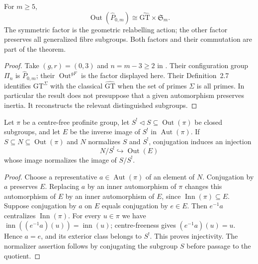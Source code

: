 For $m\geq5$,
\[
 \operatorname{Out}(\widehat P_{0,m})
       \cong\widehat{\mathrm{GT}}\times\mathfrak S_m.
\]
The symmetric factor is the geometric relabelling action; the other factor
preserves all generalized fibre subgroups.  Both factors and their
commutation are part of the theorem.
\begin{proof}
Take $(g,r)=(0,3)$ and $n=m-3\geq2$ in
\citet[Corollaries~2.6(i),(iii) and~2.8(i),(ii)]{HoshiMinamideMochizuki2022}.
Their configuration group $\Pi_n$ is $\widehat P_{0,m}$; their
$\operatorname{Out}^{gF}$ is the factor displayed here.  Their
Definition~2.7 identifies $\mathrm{GT}^{\Sigma}$ with the classical
$\widehat{\mathrm{GT}}$ when the set of primes $\Sigma$ is all primes.
In particular the result does not presuppose that a given automorphism
preserves inertia.  It reconstructs the relevant distinguished subgroups.
\end{proof}

Let $\pi$ be a centre-free profinite group, let
$S^!\triangleleft S\subseteq\operatorname{Out}(\pi)$ be closed subgroups,
and let $E$ be the inverse image of $S^!$ in $\operatorname{Aut}(\pi)$.
If $S\subseteq N\subseteq\operatorname{Out}(\pi)$ and $N$ normalizes
$S$ and $S^!$, conjugation induces an injection
\[
 N/S^!\hookrightarrow\operatorname{Out}(E)
\]
whose image normalizes the image of $S/S^!$.
\begin{proof}
Choose a representative $a\in\operatorname{Aut}(\pi)$ of an element of
$N$.  Conjugation by $a$ preserves $E$.  Replacing $a$ by an inner
automorphism of $\pi$ changes this automorphism of $E$ by an inner
automorphism of $E$, since $\operatorname{Inn}(\pi)\subseteq E$.
Suppose conjugation by $a$ on $E$ equals conjugation by $e\in E$.
Then $e^{-1}a$ centralizes $\operatorname{Inn}(\pi)$.  For every
$u\in\pi$ we have
$\operatorname{inn}((e^{-1}a)(u))=\operatorname{inn}(u)$; centre-freeness
gives $(e^{-1}a)(u)=u$.  Hence $a=e$, and its exterior class belongs to
$S^!$.  This proves injectivity.  The normalizer assertion follows by
conjugating the subgroup $S$ before passage to the quotient.
\end{proof}

